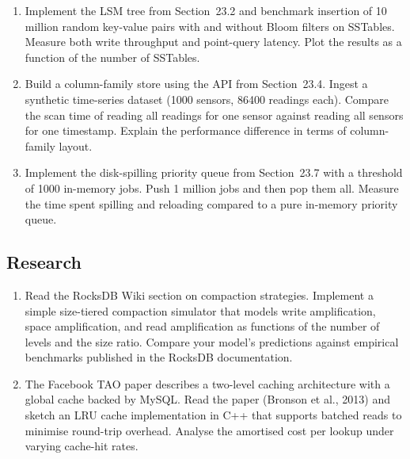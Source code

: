 \begin{enumerate}
    \item Implement the LSM tree from Section~23.2 and benchmark insertion of
    10 million random key-value pairs with and without Bloom filters on SSTables.
    Measure both write throughput and point-query latency.  Plot the results as a
    function of the number of SSTables.

    \item Build a column-family store using the API from Section~23.4.  Ingest a
    synthetic time-series dataset (1000 sensors, 86400 readings each).  Compare
    the scan time of reading all readings for one sensor against reading all
    sensors for one timestamp.  Explain the performance difference in terms of
    column-family layout.

    \item Implement the disk-spilling priority queue from Section~23.7 with a
    threshold of 1000 in-memory jobs.  Push 1 million jobs and then pop them all.
    Measure the time spent spilling and reloading compared to a pure in-memory
    priority queue.
\end{enumerate}

\subsection{Research}

\begin{enumerate}
    \item Read the RocksDB Wiki section on compaction strategies.  Implement a
    simple size-tiered compaction simulator that models write amplification, space
    amplification, and read amplification as functions of the number of levels and
    the size ratio.  Compare your model's predictions against empirical benchmarks
    published in the RocksDB documentation.

    \item The Facebook TAO paper describes a two-level caching architecture with
    a global cache backed by MySQL.  Read the paper (Bronson et al., 2013) and
    sketch an LRU cache implementation in C++ that supports batched reads to
    minimise round-trip overhead.  Analyse the amortised cost per lookup under
    varying cache-hit rates.
\end{enumerate}


